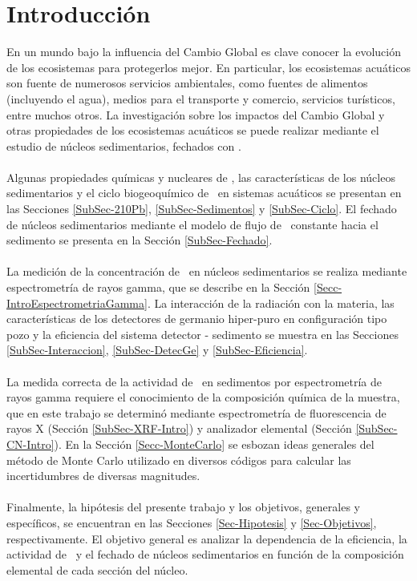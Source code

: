 \chapter{Introducción}
\lettrine{E}{}n un mundo bajo la influencia del Cambio Global es clave conocer la evolución de los ecosistemas para protegerlos mejor. En particular, los ecosistemas acuáticos son fuente de numerosos servicios ambientales, como fuentes de alimentos (incluyendo el agua), medios para el transporte y comercio, servicios turísticos, entre muchos otros. La investigación sobre los impactos del Cambio Global y otras propiedades de los ecosistemas acuáticos se puede realizar mediante el estudio de núcleos sedimentarios, fechados con \PbCero. 
\\
\\
Algunas propiedades químicas y nucleares de \PbCero, las características de los núcleos sedimentarios y el ciclo biogeoquímico de \PbCero\, en sistemas acuáticos se presentan en las Secciones \ref{SubSec-210Pb}, \ref{SubSec-Sedimentos} y \ref{SubSec-Ciclo}.  El fechado de núcleos sedimentarios mediante el modelo de flujo de \PbCero\, constante hacia el sedimento se presenta en la Sección \ref{SubSec-Fechado}. 
\\
\\ 
La medición de la concentración de \PbCero\, en núcleos sedimentarios se realiza mediante espectrometría de rayos gamma, que se describe en la Sección \ref{Secc-IntroEspectrometriaGamma}. La interacción de la radiación con la materia, las características de los detectores de germanio hiper-puro en configuración tipo pozo y la eficiencia del sistema detector - sedimento se muestra en las Secciones \ref{SubSec-Interaccion}, \ref{SubSec-DetecGe}  y \ref{SubSec-Eficiencia}. 
\\
\\ 
La medida correcta de la actividad de \PbCero\, en sedimentos por espectrometría de rayos gamma requiere el conocimiento de la composición química de la muestra, que en este trabajo se determinó mediante espectrometría de fluorescencia de rayos X (Sección \ref{SubSec-XRF-Intro}) y analizador elemental (Sección \ref{SubSec-CN-Intro}). En la Sección \ref{Secc-MonteCarlo} se esbozan ideas generales del método de Monte Carlo utilizado en diversos códigos para calcular las incertidumbres de diversas magnitudes.
\\
\\ 
Finalmente, la hipótesis del presente trabajo y los objetivos, generales y específicos, se encuentran en las Secciones \ref{Sec-Hipotesis} y \ref{Sec-Objetivos}, respectivamente. El objetivo general es analizar la dependencia de la eficiencia, la actividad de \PbCero\, y el fechado de núcleos sedimentarios en función de la composición elemental de cada sección del núcleo. 
